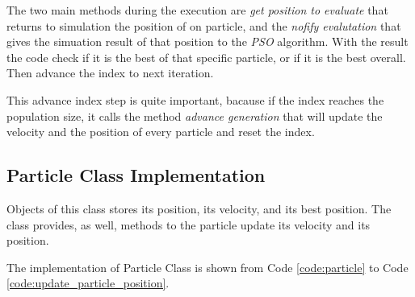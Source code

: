 







The two main methods during the execution are \textit{get position to evaluate} that returns to simulation the position of on particle, and the \textit{nofify evalutation} that gives the simuation result of that position to the \textit{PSO} algorithm. With the result the code check if it is the best of that specific particle, or if it is the best overall. Then advance the index to next iteration.

This advance index step is quite important, bacause if the index reaches the population size, it calls the method \textit{advance generation} that will update the velocity and the position of every particle and reset the index.

\subsection {Particle Class Implementation}

Objects of this class stores its position, its velocity, and its best position. The class provides, as well, methods to the particle update its velocity and its position.

The implementation of Particle Class is shown from Code \ref{code:particle} to Code \ref{code:update_particle_position}.



